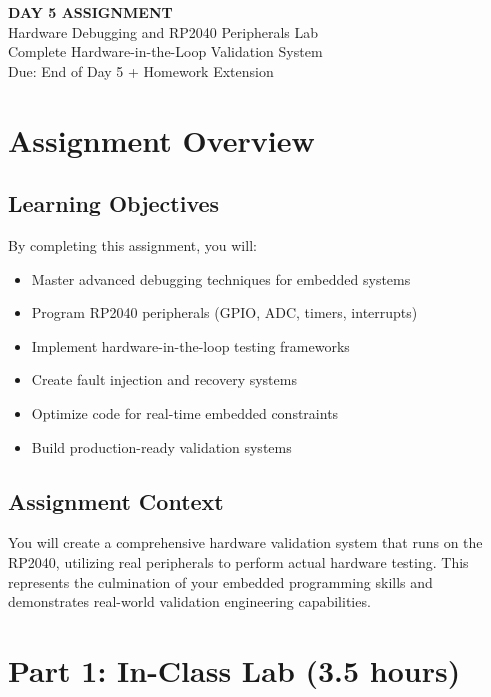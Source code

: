 \documentclass[11pt,a4paper]{article}
\begin{document}
\begin{center}
    {\Huge\bfseries\color{codeblue} DAY 5 ASSIGNMENT}\\[0.5cm]
    {\Large Hardware Debugging and RP2040 Peripherals Lab}\\[0.3cm]
    {\large Complete Hardware-in-the-Loop Validation System}\\[0.2cm]
    {\normalsize Due: End of Day 5 + Homework Extension}
\end{center}

\vspace{1cm}

\section{Assignment Overview}

\subsection{Learning Objectives}
By completing this assignment, you will:
\begin{itemize}
    \item Master advanced debugging techniques for embedded systems
    \item Program RP2040 peripherals (GPIO, ADC, timers, interrupts)
    \item Implement hardware-in-the-loop testing frameworks
    \item Create fault injection and recovery systems
    \item Optimize code for real-time embedded constraints
    \item Build production-ready validation systems
\end{itemize}

\subsection{Assignment Context}
You will create a comprehensive hardware validation system that runs on the RP2040, utilizing real peripherals to perform actual hardware testing. This represents the culmination of your embedded programming skills and demonstrates real-world validation engineering capabilities.

\section{Part 1: In-Class Lab (3.5 hours)}
\end{document}
